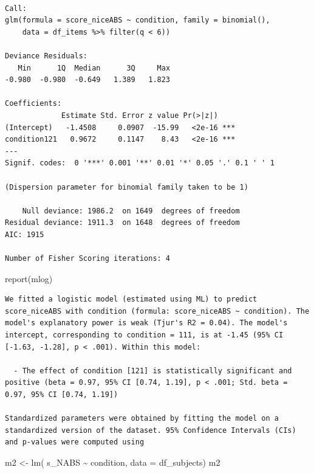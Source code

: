 \documentclass[
  letterpaper,
  DIV=11,
  numbers=noendperiod]{scrreprt}
\newenvironment{Shaded}{\begin{snugshade}}{\end{snugshade}}
\newcommand{\AttributeTok}[1]{\textcolor[rgb]{0.40,0.45,0.13}{#1}}
\newcommand{\FunctionTok}[1]{\textcolor[rgb]{0.28,0.35,0.67}{#1}}
\newcommand{\NormalTok}[1]{\textcolor[rgb]{0.00,0.23,0.31}{#1}}
\newcommand{\OtherTok}[1]{\textcolor[rgb]{0.00,0.23,0.31}{#1}}
\newcommand{\SpecialCharTok}[1]{\textcolor[rgb]{0.37,0.37,0.37}{#1}}
\begin{document}
\begin{verbatim}

Call:
glm(formula = score_niceABS ~ condition, family = binomial(), 
    data = df_items %>% filter(q < 6))

Deviance Residuals: 
   Min      1Q  Median      3Q     Max  
-0.980  -0.980  -0.649   1.389   1.823  

Coefficients:
             Estimate Std. Error z value Pr(>|z|)    
(Intercept)   -1.4508     0.0907  -15.99   <2e-16 ***
condition121   0.9672     0.1147    8.43   <2e-16 ***
---
Signif. codes:  0 '***' 0.001 '**' 0.01 '*' 0.05 '.' 0.1 ' ' 1

(Dispersion parameter for binomial family taken to be 1)

    Null deviance: 1986.2  on 1649  degrees of freedom
Residual deviance: 1911.3  on 1648  degrees of freedom
AIC: 1915

Number of Fisher Scoring iterations: 4
\end{verbatim}

\begin{Shaded}
\begin{Highlighting}[]
\FunctionTok{report}\NormalTok{(mlog)}
\end{Highlighting}
\end{Shaded}

\begin{verbatim}
We fitted a logistic model (estimated using ML) to predict score_niceABS with condition (formula: score_niceABS ~ condition). The model's explanatory power is weak (Tjur's R2 = 0.04). The model's intercept, corresponding to condition = 111, is at -1.45 (95% CI [-1.63, -1.28], p < .001). Within this model:

  - The effect of condition [121] is statistically significant and positive (beta = 0.97, 95% CI [0.74, 1.19], p < .001; Std. beta = 0.97, 95% CI [0.74, 1.19])

Standardized parameters were obtained by fitting the model on a standardized version of the dataset. 95% Confidence Intervals (CIs) and p-values were computed using 
\end{verbatim}

\begin{Shaded}
\begin{Highlighting}[]
\NormalTok{m2 }\OtherTok{\textless{}{-}} \FunctionTok{lm}\NormalTok{( s\_NABS }\SpecialCharTok{\textasciitilde{}}\NormalTok{ condition, }\AttributeTok{data =}\NormalTok{ df\_subjects)}
\NormalTok{m2}
\end{Highlighting}
\end{Shaded}
\end{document}
